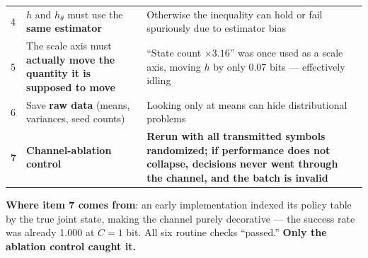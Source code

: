 \documentclass[11pt]{article}
\begin{document}
\begin{longtable}[]{@{}lll@{}}
\begin{minipage}[t]{0.30\columnwidth}
4\strut
\end{minipage} & \begin{minipage}[t]{0.30\columnwidth}\raggedright
\(h\) and \(h_\theta\) must use the \textbf{same estimator}\strut
\end{minipage} & \begin{minipage}[t]{0.30\columnwidth}\raggedright
Otherwise the inequality can hold or fail spuriously due to estimator bias\strut
\end{minipage}\tabularnewline
\begin{minipage}[t]{0.30\columnwidth}\raggedright
5\strut
\end{minipage} & \begin{minipage}[t]{0.30\columnwidth}\raggedright
The scale axis must \textbf{actually move the quantity it is supposed to move}\strut
\end{minipage} & \begin{minipage}[t]{0.30\columnwidth}\raggedright
``State count \(\times3.16\)'' was once used as a scale axis, moving \(h\) by only 0.07 bits --- effectively idling\strut
\end{minipage}\tabularnewline
\begin{minipage}[t]{0.30\columnwidth}\raggedright
6\strut
\end{minipage} & \begin{minipage}[t]{0.30\columnwidth}\raggedright
Save \textbf{raw data} (means, variances, seed counts)\strut
\end{minipage} & \begin{minipage}[t]{0.30\columnwidth}\raggedright
Looking only at means can hide distributional problems\strut
\end{minipage}\tabularnewline
\begin{minipage}[t]{0.30\columnwidth}\raggedright
\textbf{7}\strut
\end{minipage} & \begin{minipage}[t]{0.30\columnwidth}\raggedright
\textbf{Channel-ablation control}\strut
\end{minipage} & \begin{minipage}[t]{0.30\columnwidth}\raggedright
\textbf{Rerun with all transmitted symbols randomized; if performance does not collapse, decisions never went through the channel, and the batch is invalid}\strut
\end{minipage}\tabularnewline
\bottomrule
\end{longtable}

\textbf{Where item 7 comes from}: an early implementation indexed its policy table by the true joint state, making the channel purely decorative --- the success rate was already 1.000 at \(C=1\) bit. All six routine checks ``passed.'' \textbf{Only the ablation control caught it.}
\end{document}

